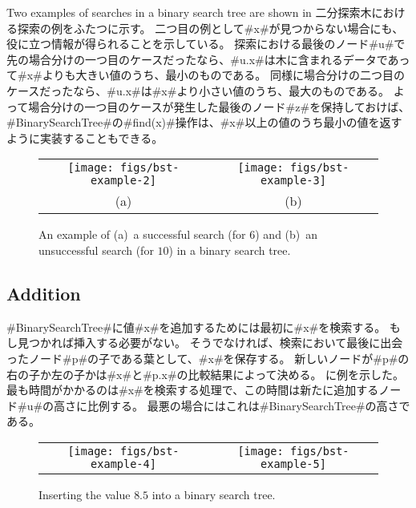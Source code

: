 Two examples of searches in a binary search tree are shown in
二分探索木における探索の例をふたつに示す。
二つ目の例として#x#が見つからない場合にも、役に立つ情報が得られることを示している。
探索における最後のノード#u#で先の場合分けの一つ目のケースだったなら、#u.x#は木に含まれるデータであって#x#よりも大きい値のうち、最小のものである。
同様に場合分けの二つ目のケースだったなら、#u.x#は#x#より小さい値のうち、最大のものである。
よって場合分けの一つ目のケースが発生した最後のノード#z#を保持しておけば、#BinarySearchTree#の#find(x)#操作は、#x#以上の値のうち最小の値を返すように実装することもできる。

\begin{figure}
  \begin{center}
    \begin{tabular}{cc}
    \texttt{[image: figs/bst-example-2]} &
    \texttt{[image: figs/bst-example-3]} \\
    (a) & (b)
    \end{tabular}
  \end{center}
  \caption{An example of (a)~a successful search (for $6$) and (b)~an unsuccessful search (for $10$) in a binary search tree.}
\end{figure}


\subsection{Addition}

#BinarySearchTree#に値#x#を追加するためには最初に#x#を検索する。
もし見つかれば挿入する必要がない。
そうでなければ、検索において最後に出会ったノード#p#の子である葉として、#x#を保存する。
新しいノードが#p#の右の子か左の子かは#x#と#p.x#の比較結果によって決める。
に例を示した。
最も時間がかかるのは#x#を検索する処理で、この時間は新たに追加するノード#u#の高さに比例する。
最悪の場合にはこれは#BinarySearchTree#の高さである。


\begin{figure}
  \begin{center}
    \begin{tabular}{cc}
    \texttt{[image: figs/bst-example-4]} &
    \texttt{[image: figs/bst-example-5]} 
    \end{tabular}
  \end{center}
  \caption{Inserting the value $8.5$ into a binary search tree.}
\end{figure}


